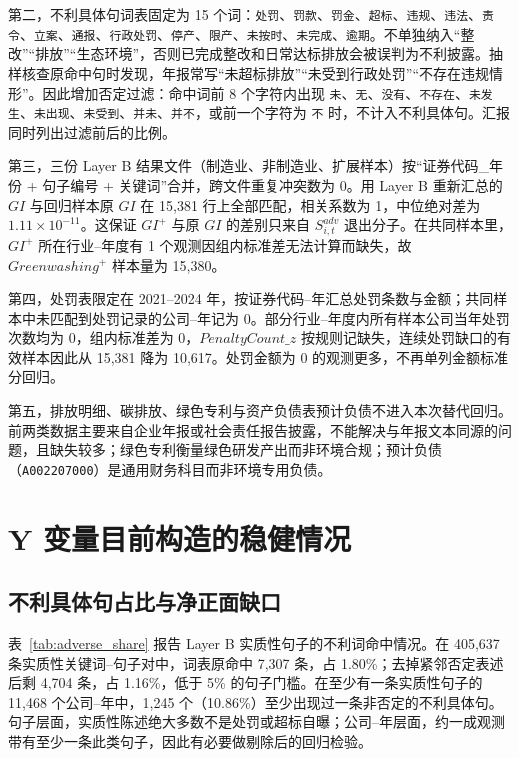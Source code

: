 \documentclass[12pt,a4paper]{article}
\begin{document}
第二，不利具体句词表固定为 15 个词：\texttt{处罚}、\texttt{罚款}、\texttt{罚金}、\texttt{超标}、\texttt{违规}、\texttt{违法}、\texttt{责令}、\texttt{立案}、\texttt{通报}、\texttt{行政处罚}、\texttt{停产}、\texttt{限产}、\texttt{未按时}、\texttt{未完成}、\texttt{逾期}。不单独纳入``整改''``排放''``生态环境''，否则已完成整改和日常达标排放会被误判为不利披露。抽样核查原命中句时发现，年报常写``未超标排放''``未受到行政处罚''``不存在违规情形''。因此增加否定过滤：命中词前 8 个字符内出现 \texttt{未}、\texttt{无}、\texttt{没有}、\texttt{不存在}、\texttt{未发生}、\texttt{未出现}、\texttt{未受到}、\texttt{并未}、\texttt{并不}，或前一个字符为 \texttt{不} 时，不计入不利具体句。汇报同时列出过滤前后的比例。

第三，三份 Layer B 结果文件（制造业、非制造业、扩展样本）按``证券代码\_年份 + 句子编号 + 关键词''合并，跨文件重复冲突数为 0。用 Layer B 重新汇总的 $GI$ 与回归样本原 $GI$ 在 15,381 行上全部匹配，相关系数为 1，中位绝对差为 $1.11\times 10^{-11}$。这保证 $GI^+$ 与原 $GI$ 的差别只来自 $S^{adv}_{i,t}$ 退出分子。在共同样本里，$GI^+$ 所在行业--年度有 1 个观测因组内标准差无法计算而缺失，故 $Greenwashing^+$ 样本量为 15,380。

第四，处罚表限定在 2021--2024 年，按证券代码--年汇总处罚条数与金额；共同样本中未匹配到处罚记录的公司--年记为 0。部分行业--年度内所有样本公司当年处罚次数均为 0，组内标准差为 0，$PenaltyCount\_z$ 按规则记缺失，连续处罚缺口的有效样本因此从 15,381 降为 10,617。处罚金额为 0 的观测更多，不再单列金额标准分回归。

第五，排放明细、碳排放、绿色专利与资产负债表预计负债不进入本次替代回归。前两类数据主要来自企业年报或社会责任报告披露，不能解决与年报文本同源的问题，且缺失较多；绿色专利衡量绿色研发产出而非环境合规；预计负债（\texttt{A002207000}）是通用财务科目而非环境专用负债。

\section{Y 变量目前构造的稳健情况}

\subsection{不利具体句占比与净正面缺口}

表~\ref{tab:adverse_share} 报告 Layer B 实质性句子的不利词命中情况。在 405,637 条实质性关键词--句子对中，词表原命中 7,307 条，占 1.80\%；去掉紧邻否定表述后剩 4,704 条，占 1.16\%，低于 5\% 的句子门槛。在至少有一条实质性句子的 11,468 个公司--年中，1,245 个（10.86\%）至少出现过一条非否定的不利具体句。句子层面，实质性陈述绝大多数不是处罚或超标自曝；公司--年层面，约一成观测带有至少一条此类句子，因此有必要做剔除后的回归检验。
\end{document}
